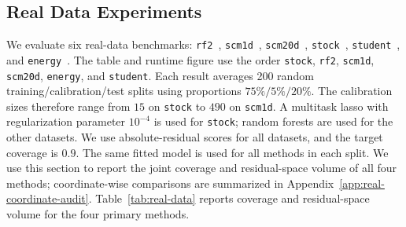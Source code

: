 \subsection{Real Data Experiments}
\label{sec:real-data-experiments}

We evaluate six real-data benchmarks:
\texttt{rf2}~\citep{grigorios_tsoumakas_eleftherios_spyromitros-xioufis_william_groves_ioannis_vlahavas_2022},
\texttt{scm1d}~\citep{scm1d}, \texttt{scm20d}~\citep{scm20d},
\texttt{stock}~\citep{stock_portfolio_performance_390},
\texttt{student}~\citep{cortez2008student}, and
\texttt{energy}~\citep{tsanas2012energy}. The table and runtime figure use the order
\texttt{stock}, \texttt{rf2}, \texttt{scm1d}, \texttt{scm20d},
\texttt{energy}, and \texttt{student}. Each result averages 200 random
training/calibration/test splits using proportions $75\%/5\%/20\%$. The
calibration sizes therefore range from $15$ on \texttt{stock} to $490$ on
\texttt{scm1d}. A multitask lasso with regularization parameter $10^{-4}$ is
used for \texttt{stock}; random forests are used for the other datasets. We use absolute-residual scores for all datasets, and the target coverage is $0.9$. The same fitted model is used for all methods in each split. We use this section to report the joint coverage and residual-space volume of all four methods; coordinate-wise comparisons are summarized in Appendix~\ref{app:real-coordinate-audit}.
Table~\ref{tab:real-data} reports coverage and residual-space volume for the
four primary methods.

